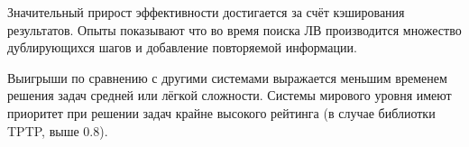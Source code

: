 Значительный прирост эффективности достигается за счёт кэширования результатов. Опыты показывают что во время поиска ЛВ производится множество дублирующихся шагов и добавление повторяемой информации.

Выигрыши по сравнению с другими системами выражается меньшим временем решения задач средней или лёгкой сложности. Системы мирового уровня имеют приоритет при решении задач крайне высокого рейтинга (в случае библиотки TPTP, выше 0.8).



